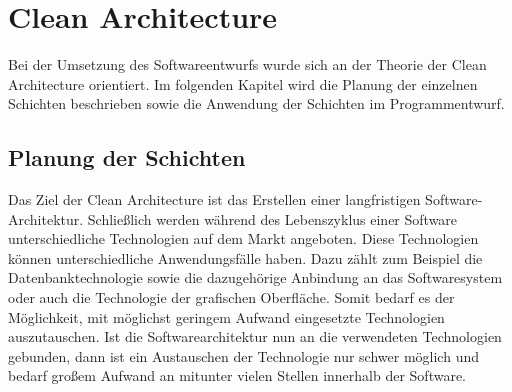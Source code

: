 \chapter{Clean Architecture}
Bei der Umsetzung des Softwareentwurfs wurde sich an der Theorie der Clean Architecture orientiert.
Im folgenden Kapitel wird die Planung der einzelnen Schichten beschrieben sowie die Anwendung der Schichten im Programmentwurf.

\section{Planung der Schichten}
Das Ziel der Clean Architecture ist das Erstellen einer langfristigen Software-Architektur.
Schließlich werden während des Lebenszyklus einer Software unterschiedliche Technologien auf dem Markt angeboten.
Diese Technologien können unterschiedliche Anwendungsfälle haben.
Dazu zählt zum Beispiel die Datenbanktechnologie sowie die dazugehörige Anbindung an das Softwaresystem oder auch die Technologie der grafischen Oberfläche.
Somit bedarf es der Möglichkeit, mit möglichst geringem Aufwand eingesetzte Technologien auszutauschen.
Ist die Softwarearchitektur nun an die verwendeten Technologien gebunden, dann ist ein Austauschen der Technologie nur schwer möglich und bedarf großem Aufwand an mitunter vielen Stellen innerhalb der Software.

